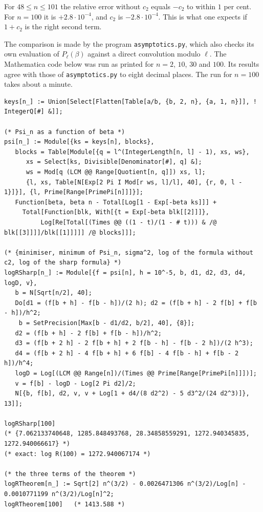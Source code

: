 \documentclass[10pt]{article}
\begin{document}
For $48\le n\le 101$ the relative error without $c_2$ equals $-c_2$ to within $1$ per cent. For $n=100$
it is $+2.8\cdot10^{-4}$, and $c_2$ is $-2.8\cdot10^{-4}$. This is what one expects if $1+c_2$ is the right second term.

The comparison is made by the program \texttt{asymptotics.py}, which also checks its own evaluation of
$P_\ell(\beta)$ against a direct convolution modulo $\ell$. The Mathematica code below was run as printed for
$n=2$, $10$, $30$ and $100$. Its results agree with those of \texttt{asymptotics.py} to eight decimal places.
The run for $n=100$ takes about a minute.

\begingroup\footnotesize
\begin{verbatim}
keys[n_] := Union[Select[Flatten[Table[a/b, {b, 2, n}, {a, 1, n}]], ! IntegerQ[#] &]];

(* Psi_n as a function of beta *)
psi[n_] := Module[{ks = keys[n], blocks},
   blocks = Table[Module[{q = l^(IntegerLength[n, l] - 1), xs, ws},
      xs = Select[ks, Divisible[Denominator[#], q] &];
      ws = Mod[q (LCM @@ Range[Quotient[n, q]]) xs, l];
      {l, xs, Table[N[Exp[2 Pi I Mod[r ws, l]/l], 40], {r, 0, l - 1}]}], {l, Prime[Range[PrimePi[n]]]}];
   Function[beta, beta n - Total[Log[1 - Exp[-beta ks]]] +
     Total[Function[blk, With[{t = Exp[-beta blk[[2]]]},
          Log[Re[Total[(Times @@ ((1 - t)/(1 - # t))) & /@ blk[[3]]]]/blk[[1]]]]] /@ blocks]]];

(* {minimiser, minimum of Psi_n, sigma^2, log of the formula without c2, log of the sharp formula} *)
logRSharp[n_] := Module[{f = psi[n], h = 10^-5, b, d1, d2, d3, d4, logD, v},
   b = N[Sqrt[n/2], 40];
   Do[d1 = (f[b + h] - f[b - h])/(2 h); d2 = (f[b + h] - 2 f[b] + f[b - h])/h^2;
    b = SetPrecision[Max[b - d1/d2, b/2], 40], {8}];
   d2 = (f[b + h] - 2 f[b] + f[b - h])/h^2;
   d3 = (f[b + 2 h] - 2 f[b + h] + 2 f[b - h] - f[b - 2 h])/(2 h^3);
   d4 = (f[b + 2 h] - 4 f[b + h] + 6 f[b] - 4 f[b - h] + f[b - 2 h])/h^4;
   logD = Log[(LCM @@ Range[n])/(Times @@ Prime[Range[PrimePi[n]]])];
   v = f[b] - logD - Log[2 Pi d2]/2;
   N[{b, f[b], d2, v, v + Log[1 + d4/(8 d2^2) - 5 d3^2/(24 d2^3)]}, 13]];

logRSharp[100]
(* {7.062133740648, 1285.848493768, 28.34858559291, 1272.940345835, 1272.940066617} *)
(* exact: log R(100) = 1272.940067174 *)

(* the three terms of the theorem *)
logRTheorem[n_] := Sqrt[2] n^(3/2) - 0.0026471306 n^(3/2)/Log[n] - 0.0010771199 n^(3/2)/Log[n]^2;
logRTheorem[100]   (* 1413.588 *)
\end{verbatim}
\endgroup
\end{document}

